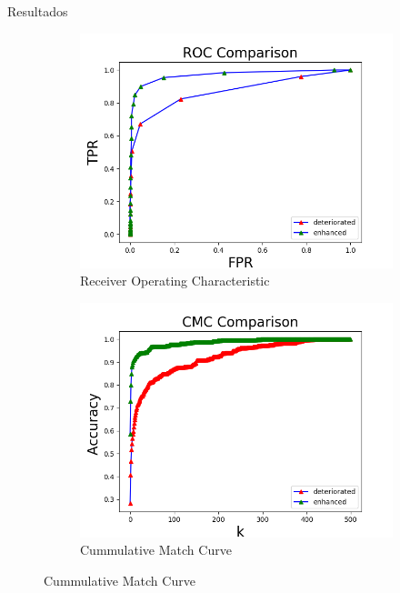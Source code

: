 \documentclass[12pt,aspectratio=169]{beamer}
\begin{document}
\begin{frame}{Resultados}

    \begin{figure}
        \begin{subfigure}{0.48\textwidth}
            \centering
            \includegraphics[scale=0.45]{figs/roc_comparison.png}
            \caption{Receiver Operating Characteristic}
        \end{subfigure}
        \begin{subfigure}{0.48\textwidth}
            \centering
            \includegraphics[scale=0.45]{figs/cmc_comparison.png}  
            \caption{Cummulative Match Curve}
        \end{subfigure}
    \end{figure}

\end{frame}
\end{document}

